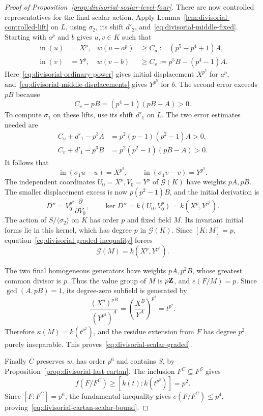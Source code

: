 \begin{proof}[Proof of Proposition~\ref{prop:divisorial-scalar-level-four}]
There are now controlled representatives for the final scalar action. Apply Lemma~\ref{lem:divisorial-controlled-lift} on $L$, using $\sigma_2$, its shift $d'_2$, and~\eqref{eq:divisorial-middle-fixed}. Starting with $a^p$ and $b$ gives $u,v\in K$ such that
\begin{align}
 \operatorname{in}(u)&=X^p,&
 w(u-a^p)&\ge C_u:=(p^5-p^4+1)A,\label{eq:divisorial-second-lift-x}\\
 \operatorname{in}(v)&=Y^p,&
 w(v-b)&\ge C_v:=p^5B-(p^4-1)A.\label{eq:divisorial-second-lift-y}
\end{align}
Here~\eqref{eq:divisorial-ordinary-power} gives initial displacement $X^{p^5}$ for $a^p$, and~\eqref{eq:divisorial-middle-displacements} gives $Y^{p^5}$ for $b$. The second error exceeds $pB$ because
\[
 C_v-pB=(p^4-1)(pB-A)>0.
\]
To compute $\sigma_1$ on these lifts, use its shift $d'_1$ on $L$. The two error estimates needed are
\begin{align*}
 C_u+d'_1-p^3A&=p^2(p-1)(p^2-1)A>0,\\
 C_v+d'_1-p^3B&=p^2(p^2-1)(pB-A)>0.
\end{align*}
It follows that
\[
 \operatorname{in}(\sigma_1u-u)=X^{p^3},\qquad
 \operatorname{in}(\sigma_1v-v)=Y^{p^3}.
\]
The independent coordinates $U_0=X^p,V_0=Y^p$ of $\mathcal G(K)$ have weights $pA,pB$. The smaller displacement excess is now $p(p^2-1)B$, and the initial derivation is
\[
 D''=V_0^{p^2}\frac{\partial}{\partial V_0},\qquad
 \ker D''=k(U_0,V_0^p)=k(X^p,Y^{p^2}).
\]
The action of $S/\langle\sigma_2\rangle$ on $K$ has order $p$ and fixed field $M$. Its invariant initial forms lie in this kernel, which has degree $p$ in $\mathcal G(K)$. Since $[K:M]=p$, equation~\eqref{eq:divisorial-graded-inequality} forces
\[
 \mathcal G(M)=k(X^p,Y^{p^2}).
\]

The two final homogeneous generators have weights $pA,p^2B$, whose greatest common divisor is $p$. Thus the value group of $M$ is $p\mathbf Z$, and $e(F/M)=p$. Since $\gcd(A,pB)=1$, its degree-zero subfield is generated by
\[
 \frac{(X^p)^{pB}}{(Y^{p^2})^A}
      =\left(\frac{X^B}{Y^A}\right)^{p^2}=t^{p^2}.
\]
Therefore $\kappa(M)=k(t^{p^2})$, and the residue extension from $F$ has degree $p^2$, purely inseparable. This proves~\eqref{eq:divisorial-scalar-graded}.

Finally $C$ preserves $w$, has order $p^6$ and contains $S$, by Proposition~\ref{prop:divisorial-last-cartan}. The inclusion $F^C\subseteq F^S$ gives
\[
 f(F/F^C)\ge [k(t):k(t^{p^2})]=p^2.
\]
Since $[F:F^C]=p^6$, the fundamental inequality gives $e(F/F^C)\le p^4$, proving~\eqref{eq:divisorial-cartan-scalar-bound}.
\end{proof}

